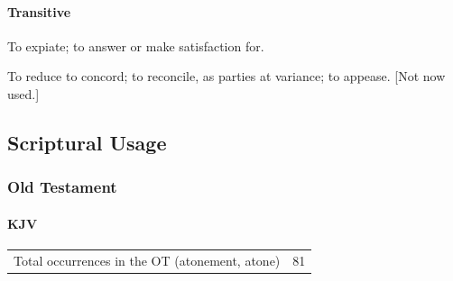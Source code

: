 		\paragraph{Transitive}
		
			\begin{compactenum}
				\item To expiate; to answer or make satisfaction for.
				\item To reduce to concord; to reconcile, as parties at variance; to appease. [Not now used.]
			\end{compactenum}



\subsection{Scriptural Usage} %
	\label{ATONEMENT-SCRIPTURES}

	\subsubsection{Old Testament} %
		\label{ATONEMENT-OT}
	
		\paragraph{KJV}
			\label{ATONEMENT-OT-KJV}
	
			\begin{tabular}{ll}
				Total occurrences in the OT (atonement, atone) & 81
			\end{tabular}
			
			\begin{compactdesc}
				\item[]
			\end{compactdesc}
			
		
